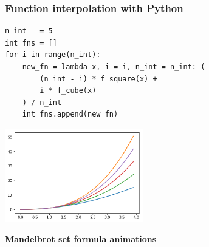 \documentclass[9pt]{beamer}
\begin{document}
\begin{frame}[fragile]
  \frametitle{Function interpolation with Python}

  \begin{lstlisting}
n_int   = 5
int_fns = []
for i in range(n_int):
    new_fn = lambda x, i = i, n_int = n_int: (
        (n_int - i) * f_square(x) +
        i * f_cube(x)
    ) / n_int
    int_fns.append(new_fn)
  \end{lstlisting}

  \begin{center}
    \includegraphics[width = 6cm]{images/interpolations.png}
  \end{center}

\end{frame}

\begin{frame}
  \begin{center}
    {\Huge \bf{Mandelbrot set formula animations}}
  \end{center}
\end{frame}
\end{document}
